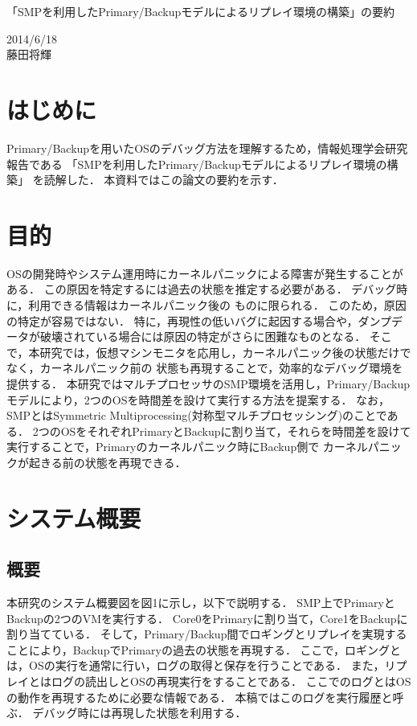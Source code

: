 \documentclass[12pt]{jsarticle}
\begin{document}

\begin{center}
{\LARGE 「SMPを利用したPrimary/Backupモデルによるリプレイ環境の構築」の要約}
\end{center}

\begin{flushright}
  2014/6/18\\
  藤田将輝
\end{flushright}
\section{はじめに}
Primary/Backupを用いたOSのデバッグ方法を理解するため，情報処理学会研究報告である
「SMPを利用したPrimary/Backupモデルによるリプレイ環境の構築」
\cite{bib1}を読解した．
本資料ではこの論文の要約を示す．


\section{目的}
OSの開発時やシステム運用時にカーネルパニックによる障害が発生することがある．
この原因を特定するには過去の状態を推定する必要がある．
デバッグ時に，利用できる情報はカーネルパニック後の
ものに限られる．
このため，原因の特定が容易ではない．
特に，再現性の低いバグに起因する場合や，ダンプデータが破壊されている場合には原因の特定がさらに困難なものとなる．
そこで，本研究では，仮想マシンモニタを応用し，カーネルパニック後の状態だけでなく，カーネルパニック前の
状態も再現することで，効率的なデバッグ環境を提供する．
本研究ではマルチプロセッサのSMP環境を活用し，Primary/Backupモデルにより，2つのOSを時間差を設けて実行する方法を提案する．
なお，SMPとはSymmetric Multiprocessing(対称型マルチプロセッシング)のことである．
2つのOSをそれぞれPrimaryとBackupに割り当て，それらを時間差を設けて実行することで，Primaryのカーネルパニック時にBackup側で
カーネルパニックが起きる前の状態を再現できる．



\section{システム概要}
\subsection{概要}
本研究のシステム概要図を図1に示し，以下で説明する．
SMP上でPrimaryとBackupの2つのVMを実行する．
Core0をPrimaryに割り当て，Core1をBackupに割り当てている．
そして，Primary/Backup間でロギングとリプレイを実現することにより，BackupでPrimaryの過去の状態を再現する．
ここで，ロギングとは，OSの実行を通常に行い，ログの取得と保存を行うことである．
また，リプレイとはログの読出しとOSの再現実行をすることである．
ここでのログとはOSの動作を再現するために必要な情報である．
本稿ではこのログを実行履歴と呼ぶ．
デバッグ時には再現した状態を利用する．
\end{document}
